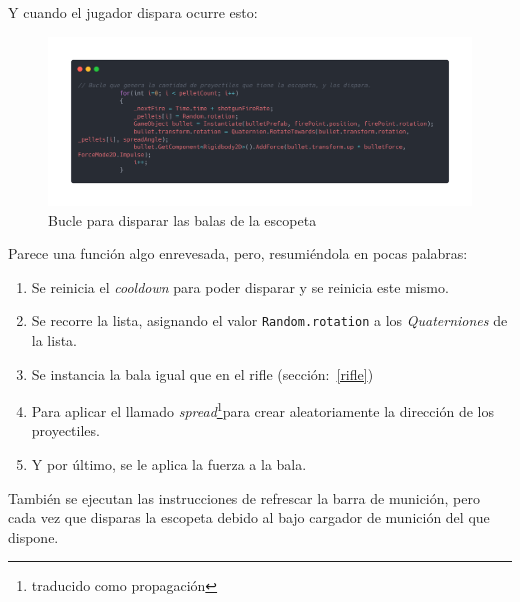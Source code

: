 \documentclass[12pt]{article}
\begin{document}
            Y cuando el jugador dispara ocurre esto:\\
            \begin{figure}[H]
                \centering
                \includegraphics[width=\textwidth]{Images/ShootyMacShooty/shootpelletes.png}
                \caption{Bucle para disparar las balas de la escopeta}
            \end{figure}
            Parece una función algo enrevesada, pero, resumiéndola en pocas palabras:
            \begin{enumerate}
                \item Se reinicia el \textit{cooldown} para poder disparar y se reinicia este mismo.
                \item Se recorre la lista, asignando el valor \texttt{Random.rotation} a los \textit{Quaterniones} de la lista.
                \item Se instancia la bala igual que en el rifle (sección:~\ref*{rifle})
                \item Para aplicar el llamado \textit{spread}\footnote{traducido como propagación}para crear aleatoriamente la dirección de los proyectiles. 
                \item Y por último, se le aplica la fuerza a la bala.
            \end{enumerate}
            También se ejecutan las instrucciones de refrescar la barra de munición, pero cada vez que disparas la escopeta debido al bajo cargador de munición del que dispone. \\
            
\end{document}
